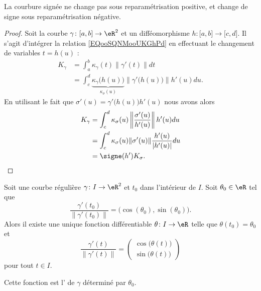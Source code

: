 \begin{lemma}
    La courbure signée ne change pas sous reparamétrisation positive, et change de signe sous reparamétrisation négative.
\end{lemma}

\begin{proof}
    Soit la courbe \( \gamma\colon \mathopen[ a , b \mathclose]\to \eR^2\) et un difféomorphisme \( h\colon \mathopen[ a , b \mathclose]\to \mathopen[ c , d \mathclose]\). Il s'agit d'intégrer la relation \eqref{EQooSQNMooUKGhPd} en effectuant le changement de variables \( t=h(u)\) :
    \begin{subequations}
        \begin{align}
            K_{\gamma}&=\int_a^b\kappa_{\gamma}(t)\| \gamma'(t) \|dt\\
            &=\int_c^d\underbrace{\kappa_{\gamma}\big( h(u) \big)}_{\kappa_{\sigma}(u)}\| \gamma'\big( h(u) \big) \|h'(u)du.
        \end{align}
    \end{subequations}
    En utilisant le fait que \( \sigma'(u)=\gamma'\big( h(u) \big)h'(u)  \) nous avons alors
    \begin{subequations}
        \begin{align}
            K_{\gamma}&=\int_{c}^d\kappa_{\sigma}(u)\left\| \frac{ \sigma'(u) }{ h'(u) }   \right\|h'(u)du\\
            &=\int_c^d\kappa_{\sigma}(u)\| \sigma'(u) \|\frac{ h'(u) }{ | h'(u) | }du\\
            &=\signe(h')K_{\sigma}.
        \end{align}
    \end{subequations}
\end{proof}

\begin{lemmaDef}     \label{LEMDEFooLPWJooAnWZjb}
    Soit une courbe régulière \( \gamma\colon I\to \eR^2\) et \( t_0\) dans l'intérieur de \( I\). Soit \( \theta_0 \in \eR\) tel que
    \begin{equation}
        \frac{ \gamma'(t_0)  }{ \| \gamma'(t_0) \| }=\big( \cos(\theta_0),\sin(\theta_0) \big).
    \end{equation}
    Alors il existe une unique fonction différentiable \( \theta\colon I\to \eR\) telle que \( \theta(t_0)=\theta_0\) et
    \begin{equation}
        \frac{ \gamma'(t) }{ \| \gamma'(t) \| }=\begin{pmatrix}
            \cos\big( \theta(t) \big)    \\ 
            \sin\big( \theta(t) \big)    
        \end{pmatrix}
    \end{equation}
    pour tout \( t\in I\).

    Cette fonction est l' de \( \gamma\) déterminé par \( \theta_0\).
\end{lemmaDef}

